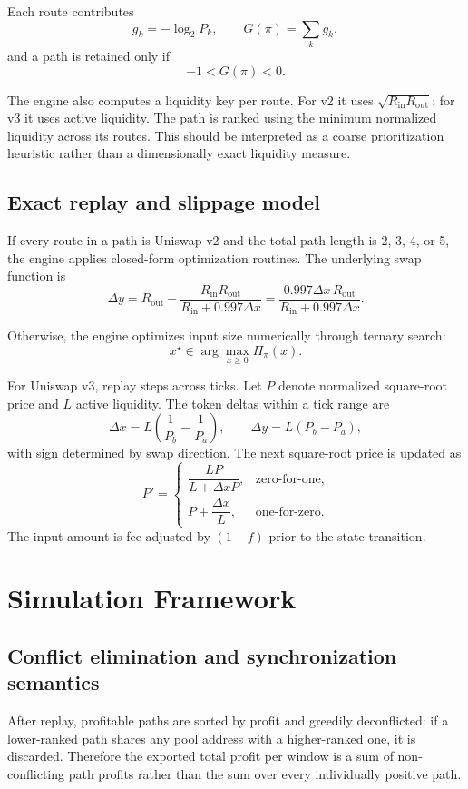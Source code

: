 \documentclass[11pt]{article}
\begin{document}
Each route contributes
\[
g_k=-\log_2 P_k,
\qquad
G(\pi)=\sum_k g_k,
\]
and a path is retained only if
\[
-1<G(\pi)<0.
\]

The engine also computes a liquidity key per route. For v2 it uses \(\sqrt{R_{\mathrm{in}}R_{\mathrm{out}}}\); for v3 it uses active liquidity. The path is ranked using the minimum normalized liquidity across its routes. This should be interpreted as a coarse prioritization heuristic rather than a dimensionally exact liquidity measure.

\subsection{Exact replay and slippage model}

If every route in a path is Uniswap v2 and the total path length is 2, 3, 4, or 5, the engine applies closed-form optimization routines. The underlying swap function is
\[
\Delta y
=
R_{\mathrm{out}}-\frac{R_{\mathrm{in}}R_{\mathrm{out}}}{R_{\mathrm{in}}+0.997\Delta x}
=
\frac{0.997\Delta x\,R_{\mathrm{out}}}{R_{\mathrm{in}}+0.997\Delta x}.
\]

Otherwise, the engine optimizes input size numerically through ternary search:
\[
x^{\star}\in\arg\max_{x\ge 0}\Pi_{\pi}(x).
\]

For Uniswap v3, replay steps across ticks. Let \(P\) denote normalized square-root price and \(L\) active liquidity. The token deltas within a tick range are
\[
\Delta x = L\left(\frac{1}{P_b}-\frac{1}{P_a}\right),
\qquad
\Delta y = L(P_b-P_a),
\]
with sign determined by swap direction. The next square-root price is updated as
\[
P'=
\begin{cases}
\dfrac{LP}{L+\Delta x P}, & \text{zero-for-one},\\[0.8em]
P+\dfrac{\Delta x}{L}, & \text{one-for-zero}.
\end{cases}
\]
The input amount is fee-adjusted by \((1-f)\) prior to the state transition.

\section{Simulation Framework}

\subsection{Conflict elimination and synchronization semantics}

After replay, profitable paths are sorted by profit and greedily deconflicted: if a lower-ranked path shares any pool address with a higher-ranked one, it is discarded. Therefore the exported total profit per window is a sum of non-conflicting path profits rather than the sum over every individually positive path.
\end{document}

